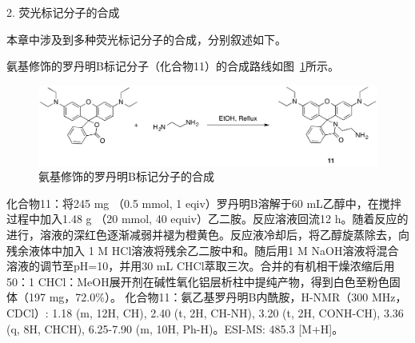 2. 荧光标记分子的合成

本章中涉及到多种荧光标记分子的合成，分别叙述如下。

氨基修饰的罗丹明B标记分子（化合物11）的合成路线如图~\ref{fig:amine-RhB}所示。
\begin{figure}[htbp]
  \centering
  \includegraphics[width=0.95\linewidth]{figures/ch5/ch5-RhB-An.png}
  \caption{氨基修饰的罗丹明B标记分子的合成}
  \label{fig:amine-RhB}
\end{figure}

化合物11：将245 mg （0.5 mmol, 1 eqiv）罗丹明B溶解于60 mL乙醇中，在搅拌过程中加入1.48 g （20 mmol, 40 equiv）乙二胺。反应溶液回流12 h。随着反应的进行，溶液的深红色逐渐减弱并褪为橙黄色。反应液冷却后，将乙醇旋蒸除去，向残余液体中加入 1 M HCl溶液将残余乙二胺中和。随后用1 M NaOH溶液将混合溶液的调节至pH=10，并用30 mL CHCl萃取三次。合并的有机相干燥浓缩后用50：1 CHCl：MeOH展开剂在碱性氧化铝层析柱中提纯产物，得到白色至粉色固体（197 mg，72.0\%）。
化合物11：氨乙基罗丹明B内酰胺，H-NMR（300 MHz，CDCl）: \text{$\delta$} 1.18 (m, 12H, CH), 2.40 (t, 2H, CH-NH), 3.20 (t, 2H, CONH-CH), 3.36 (q, 8H, CHCH), 6.25-7.90 (m, 10H, Ph-H)。ESI-MS: 485.3 [M+H]\text{$^+$}。

